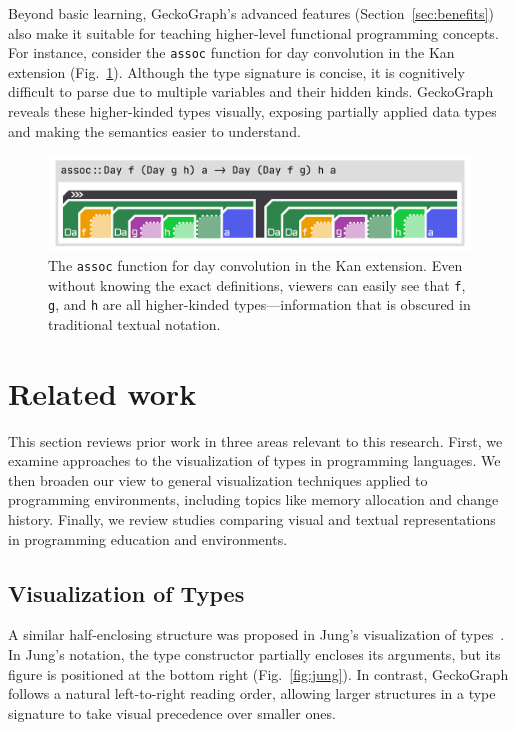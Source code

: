 \documentclass[preprint,12pt]{elsarticle}
\begin{document}
Beyond basic learning, GeckoGraph’s advanced features (Section~\ref{sec:benefits}) also make it suitable for teaching higher-level functional programming concepts. 
For instance, consider the \texttt{assoc} function for day convolution \cite{Day1970-kb} in the Kan extension (Fig.~\ref{fig:assoc}). 
Although the type signature is concise, it is cognitively difficult to parse due to multiple variables and their hidden kinds. 
GeckoGraph reveals these higher-kinded types visually, exposing partially applied data types and making the semantics easier to understand.

\begin{figure}[]
  \includegraphics[width=\linewidth]{figures/assoc}
  \caption{\label{fig:assoc} 
  The \texttt{assoc} function for day convolution \cite{Day1970-kb} in the Kan extension. 
  Even without knowing the exact definitions, viewers can easily see that \texttt{f}, \texttt{g}, and \texttt{h} are all higher-kinded types—information that is obscured in traditional textual notation.}
\end{figure}


\section{Related work} \label{sec:related-work}
This section reviews prior work in three areas relevant to this research. First, we examine approaches to the visualization of types in programming languages. 
We then broaden our view to general visualization techniques applied to programming environments, including topics like memory allocation and change history. Finally, we review studies comparing visual and textual representations in programming education and environments.

\subsection{Visualization of Types}
A similar half-enclosing structure was proposed in Jung’s visualization of types~\cite{Jung2000-oc}. In Jung’s notation, the type constructor partially encloses its arguments, but its figure is positioned at the bottom right (Fig.~\ref{fig:jung}). In contrast, GeckoGraph follows a natural left-to-right reading order, allowing larger structures in a type signature to take visual precedence over smaller ones. 
\end{document}
